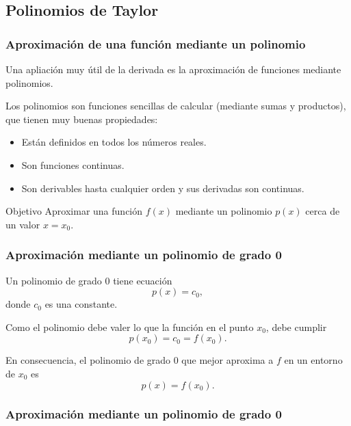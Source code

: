 \subsection{Polinomios de Taylor}
\begin{frame}
\frametitle{Aproximación de una función mediante un polinomio}
Una apliación muy útil de la derivada es la aproximación de funciones mediante polinomios. 

Los polinomios son funciones sencillas de calcular (mediante sumas y productos), que tienen muy buenas propiedades:
\begin{itemize}
\item Están definidos en todos los números reales.
\item Son funciones continuas.
\item Son derivables hasta cualquier orden y sus derivadas son continuas.  
\end{itemize}

\begin{block}{Objetivo}
Aproximar una función $f(x)$ mediante un polinomio $p(x)$ cerca de un valor $x=x_0$.
\end{block}

\end{frame}


\begin{frame}
\frametitle{Aproximación mediante un polinomio de grado 0}
Un polinomio de grado 0 tiene ecuación
\[
p(x) = c_0,
\]
donde $c_0$ es una constante.

Como el polinomio debe valer lo que la función en el punto $x_0$, debe cumplir
\[p(x_0) = c_0 = f(x_0).\]

En consecuencia, el polinomio de grado 0 que mejor aproxima a $f$ en un entorno de $x_0$ es
\[p(x) = f(x_0).\]
\end{frame}


\begin{frame}
\frametitle{Aproximación mediante un polinomio de grado 0}
\begin{center}
\scalebox{1}{}
\end{center}
\end{frame}


